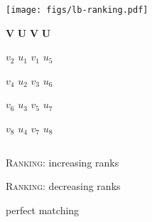 \documentclass[a4paper]{article}
\begin{document}
\begin{figure}
{\small
\begin{center}
\texttt{[image: figs/lb-ranking.pdf]}

\vspace{-3.03cm}
\textbf{V} \hspace{0.25cm} \textbf{U} \hspace{0.25cm} \textbf{V} \hspace{0.25cm} \textbf{U} \hspace{10.6cm} $ $

\vspace{0.23cm}


$v_2$ \hspace{0.25cm} $u_1$ \hspace{0.30cm} $v_1$ \hspace{0.25cm} $u_5$ \hspace{10.6cm} $ $

\vspace{0.32cm}

$v_4$ \hspace{0.25cm} $u_2$ \hspace{0.30cm} $v_3$ \hspace{0.25cm} $u_6$ \hspace{10.6cm} $ $

\vspace{0.32cm}

$v_6$ \hspace{0.25cm} $u_3$ \hspace{0.30cm} $v_5$ \hspace{0.25cm} $u_7$ \hspace{10.6cm} $ $

\vspace{0.32cm}

$v_8$ \hspace{0.25cm} $u_4$ \hspace{0.30cm} $v_7$ \hspace{0.25cm} $u_8$ \hspace{10.6cm} $ $


\vspace{-0.1cm}

$ $\hspace{3.8cm} \begin{minipage}{2cm}
\textsc{Ranking}: increasing ranks
\end{minipage} \hspace{1.4cm}
\begin{minipage}{2cm}
\textsc{Ranking}: decreasing ranks
\end{minipage} \hspace{1.2cm}
\begin{minipage}{2.5cm}
perfect matching


\end{minipage}
\end{center}}
\end{figure}
\end{document}
